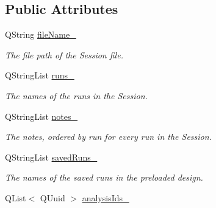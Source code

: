 \subsection*{Public Attributes}
\begin{DoxyCompactItemize}
\item 
\hypertarget{struct_preloaded_session_data_a9ec72041d54c908f34b7b3c09522bd55}{Q\-String \hyperlink{struct_preloaded_session_data_a9ec72041d54c908f34b7b3c09522bd55}{file\-Name\-\_\-}}\label{struct_preloaded_session_data_a9ec72041d54c908f34b7b3c09522bd55}

\begin{DoxyCompactList}\small\item\em The file path of the Session file. \end{DoxyCompactList}\item 
\hypertarget{struct_preloaded_session_data_a91e7e96fca4da2f0195f9667b5b1ab2e}{Q\-String\-List \hyperlink{struct_preloaded_session_data_a91e7e96fca4da2f0195f9667b5b1ab2e}{runs\-\_\-}}\label{struct_preloaded_session_data_a91e7e96fca4da2f0195f9667b5b1ab2e}

\begin{DoxyCompactList}\small\item\em The names of the runs in the Session. \end{DoxyCompactList}\item 
\hypertarget{struct_preloaded_session_data_a42fd2f236340127ddee4c7d3076139e5}{Q\-String\-List \hyperlink{struct_preloaded_session_data_a42fd2f236340127ddee4c7d3076139e5}{notes\-\_\-}}\label{struct_preloaded_session_data_a42fd2f236340127ddee4c7d3076139e5}

\begin{DoxyCompactList}\small\item\em The notes, ordered by run for every run in the Session. \end{DoxyCompactList}\item 
\hypertarget{struct_preloaded_session_data_a7dec1d02142bf49ab5aa605cd47b3486}{Q\-String\-List \hyperlink{struct_preloaded_session_data_a7dec1d02142bf49ab5aa605cd47b3486}{saved\-Runs\-\_\-}}\label{struct_preloaded_session_data_a7dec1d02142bf49ab5aa605cd47b3486}

\begin{DoxyCompactList}\small\item\em The names of the saved runs in the preloaded design. \end{DoxyCompactList}\item 
\hypertarget{struct_preloaded_session_data_a7f812ece03c96600fe57d16ea0e0bbe3}{Q\-List$<$ Q\-Uuid $>$ \hyperlink{struct_preloaded_session_data_a7f812ece03c96600fe57d16ea0e0bbe3}{analysis\-Ids\-\_\-}}\label{struct_preloaded_session_data_a7f812ece03c96600fe57d16ea0e0bbe3}


\end{DoxyCompactItemize}
